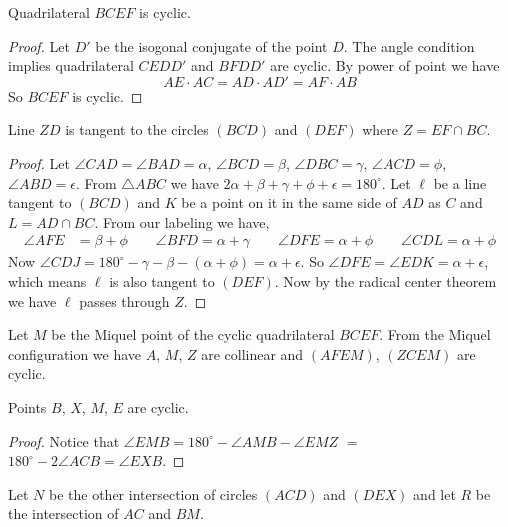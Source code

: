 \documentclass[11pt]{scrartcl}
\begin{document}
\begin{claim*}
    Quadrilateral $BCEF$ is cyclic.
\end{claim*}

\begin{proof}
    Let $D'$ be the isogonal conjugate of the point $D$. The
    angle condition implies quadrilateral $CEDD'$ and $BFDD'$
    are cyclic. By power of point we have \[ AE\cdot AC=AD\cdot AD'=AF\cdot AB \]
    So $BCEF$ is cyclic.
\end{proof}

\begin{claim*}
    Line $ZD$ is tangent to the circles $(BCD)$ and $(DEF)$
    where $Z=EF\cap BC$.
\end{claim*}

\begin{proof}
    Let $\angle CAD=\angle BAD=\alpha$, $\angle BCD=\beta$,
    $\angle DBC=\gamma$, $\angle ACD=\phi$,
    $\angle ABD=\epsilon$.
    From $\triangle ABC$ we have
    $2\alpha+\beta+\gamma+\phi+\epsilon=180^\circ$.
    Let $\ell$ be a line tangent to $(BCD)$ and $K$ be a
    point on it in the same side of $AD$ as $C$ and
    $L=AD\cap BC$. From our labeling we have,
    \begin{align*}
	    \angle AFE &= \beta + \phi \qquad \angle BFD =
	    \alpha + \gamma \qquad \angle DFE = \alpha + \phi
	    \qquad \angle CDL = \alpha + \phi
    \end{align*}
    Now $\angle CDJ = 180^\circ - \gamma - \beta - (\alpha + \phi) = \alpha + \epsilon$.
    So $\angle DFE = \angle EDK = \alpha + \epsilon$, which
    means $\ell$ is also tangent to $(DEF)$. Now by the
    radical center theorem we have $\ell$ passes through
    $Z$.
\end{proof}

Let $M$ be the Miquel point of the cyclic quadrilateral
$BCEF$. From the Miquel configuration we have $A$, $M$, $Z$
are collinear and $(AFEM)$, $(ZCEM)$ are cyclic.

\begin{claim*}
    Points $B$, $X$, $M$, $E$ are cyclic.
\end{claim*}

\begin{proof}
    Notice that $\angle EMB = 180^\circ - \angle AMB -\angle EMZ$
    $=$ $180^\circ - 2\angle ACB = \angle EXB$.
\end{proof}

Let $N$ be the other intersection of circles $(ACD)$ and
$(DEX)$ and let $R$ be the intersection of $AC$ and $BM$.
\end{document}
